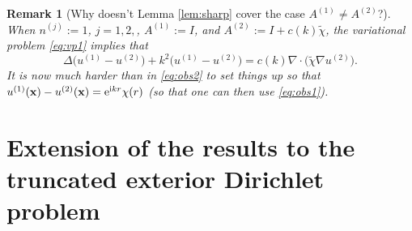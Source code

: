 \documentclass[10pt]{article}%
\newtheorem{remark}[theorem]{Remark}
\numberwithin{equation}{section}
\newcommand{\beqs}{\begin{equation*}}
\newcommand{\eeqs}{\end{equation*}}
\newcommand{\bre}{\begin{remark}}
\newcommand{\ere}{\end{remark}}
\newcommand{\bx}{\mathbf{x}}
\newcommand{\re}{{\rm e}}
\newcommand{\ri}{{\rm i}}
\newcommand{\coeffAo}{A^{(1)}}
\newcommand{\coeffAt}{A^{(2)}}
\newcommand{\coeffnj}{n^{(j)}}
\begin{document}
\bre[Why doesn't Lemma \ref{lem:sharp} cover the case $\coeffAo\neq  \coeffAt$?]
When $\coeffnj:=1$, $j=1,2,$, $\coeffAo:=I$, and $\coeffAt:= I + c(k)\widetilde{\chi}$, the variational problem \eqref{eq:vp1} implies that 
\beqs%
\Delta \big( u^{(1)} - u^{(2)}\big) + k^2 \big( u^{(1)} - u^{(2)}\big) = c(k)\nabla\cdot \big(\widetilde{\chi}\nabla u^{(2)}\big).
\eeqs
It is now much harder than in \eqref{eq:obs2} to set things up so that $ u^{(1)}(\bx) - u^{(2)}(\bx)=\re^{\ri kr}\chi(r)$ (so that one can then use \eqref{eq:obs1}).
\ere


\section{Extension of the results to the truncated exterior Dirichlet problem}\label{sec:TEDP}

\end{document}
